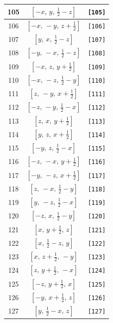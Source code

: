 \documentclass[fleqn,8pt]{jsarticle}
\begin{document}
\begin{longtable}{ccc}
105 & $\left[ - x,\, y,\, \frac{1}{2} - z \right]$ & {\tt [105]} \\ \hline
106 & $\left[ - x,\, - y,\, z + \frac{1}{2} \right]$ & {\tt [106]} \\ \hline
107 & $\left[ y,\, x,\, \frac{1}{2} - z \right]$ & {\tt [107]} \\ \hline
108 & $\left[ - y,\, - x,\, \frac{1}{2} - z \right]$ & {\tt [108]} \\ \hline
109 & $\left[ - x,\, z,\, y + \frac{1}{2} \right]$ & {\tt [109]} \\ \hline
110 & $\left[ - x,\, - z,\, \frac{1}{2} - y \right]$ & {\tt [110]} \\ \hline
111 & $\left[ z,\, - y,\, x + \frac{1}{2} \right]$ & {\tt [111]} \\ \hline
112 & $\left[ - z,\, - y,\, \frac{1}{2} - x \right]$ & {\tt [112]} \\ \hline
113 & $\left[ z,\, x,\, y + \frac{1}{2} \right]$ & {\tt [113]} \\ \hline
114 & $\left[ y,\, z,\, x + \frac{1}{2} \right]$ & {\tt [114]} \\ \hline
115 & $\left[ - y,\, z,\, \frac{1}{2} - x \right]$ & {\tt [115]} \\ \hline
116 & $\left[ - z,\, - x,\, y + \frac{1}{2} \right]$ & {\tt [116]} \\ \hline
117 & $\left[ - y,\, - z,\, x + \frac{1}{2} \right]$ & {\tt [117]} \\ \hline
118 & $\left[ z,\, - x,\, \frac{1}{2} - y \right]$ & {\tt [118]} \\ \hline
119 & $\left[ y,\, - z,\, \frac{1}{2} - x \right]$ & {\tt [119]} \\ \hline
120 & $\left[ - z,\, x,\, \frac{1}{2} - y \right]$ & {\tt [120]} \\ \hline
121 & $\left[ x,\, y + \frac{1}{2},\, z \right]$ & {\tt [121]} \\ \hline
122 & $\left[ x,\, \frac{1}{2} - z,\, y \right]$ & {\tt [122]} \\ \hline
123 & $\left[ x,\, z + \frac{1}{2},\, - y \right]$ & {\tt [123]} \\ \hline
124 & $\left[ z,\, y + \frac{1}{2},\, - x \right]$ & {\tt [124]} \\ \hline
125 & $\left[ - z,\, y + \frac{1}{2},\, x \right]$ & {\tt [125]} \\ \hline
126 & $\left[ - y,\, x + \frac{1}{2},\, z \right]$ & {\tt [126]} \\ \hline
127 & $\left[ y,\, \frac{1}{2} - x,\, z \right]$ & {\tt [127]} \\ \hline

\end{longtable}
\end{document}
